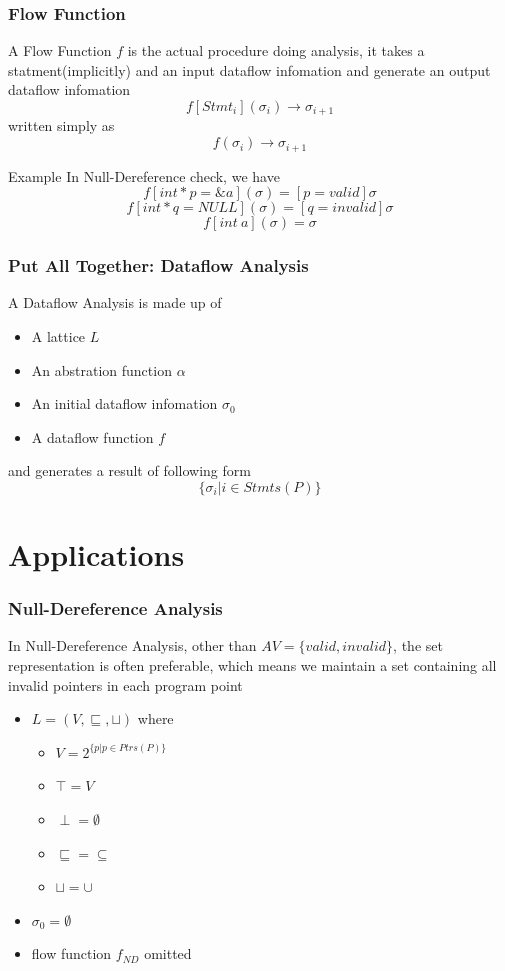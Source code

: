 \documentclass[]{beamer}
\begin{document}
\begin{frame}
  \frametitle{Flow Function}
  A \alert{Flow Function} $f$ is the actual procedure doing analysis, it takes a statment(implicitly)
  and an input dataflow infomation and generate an output dataflow infomation
  $$f[Stmt_i](\sigma_i) \rightarrow \sigma_{i+1}$$
  written simply as
  $$f(\sigma_i) \rightarrow \sigma_{i+1}$$

  \pause
  \begin{block}{Example}
    In Null-Dereference check, we have
    $$f[int *p=\&a](\sigma)=[p=valid]\sigma$$
    $$f[int *q=NULL](\sigma)=[q=invalid]\sigma$$
    $$f[int\ a](\sigma)=\sigma$$
  \end{block}
\end{frame}

\begin{frame}
  \frametitle{Put All Together: Dataflow Analysis}
  A Dataflow Analysis is made up of
  \begin{itemize}
    \item A lattice $L$
    \item An abstration function $\alpha$
    \item An initial dataflow infomation $\sigma_0$
    \item A dataflow function $f$
  \end{itemize}

  \pause
  and generates a result of following form
  $$\{\sigma_i | i \in Stmts(P)\}$$
\end{frame}

\section{Applications}
\frame{\tableofcontents[currentsection]}

\begin{frame}
  \frametitle{Null-Dereference Analysis}
  In Null-Dereference Analysis, other than $AV=\{valid, invalid\}$,
  the set representation is often preferable, which means we maintain
  a set containing all invalid pointers in each program point
  \begin{itemize}
    \item $L=(V, \sqsubseteq, \sqcup)$ where
      \begin{itemize}
      \item $V=2^{\{p | p \in Ptrs(P)\}}$
      \item $\top = V$
      \item $\perp = \emptyset$
      \item $\sqsubseteq = \subseteq$
      \item $\sqcup = \cup$
      \end{itemize}
    \item $\sigma_0 = \emptyset$
    \item flow function $f_{ND}$ omitted
  \end{itemize}
\end{frame}
\end{document}
